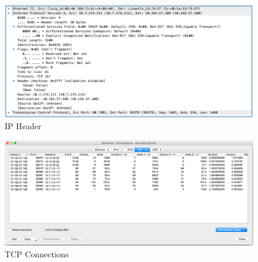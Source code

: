 \documentclass[12pt]{article}
\begin{document}
\begin{figure}[h!]
\centering
\includegraphics[scale=0.5]{../Screenshots/ip-header.png}
\caption{IP Header}
\end{figure}
\begin{figure}[h!]
\includegraphics[scale=0.39]{../Screenshots/tcp-connections.png}
\caption{TCP Connections}
\end{figure}
\end{document}
